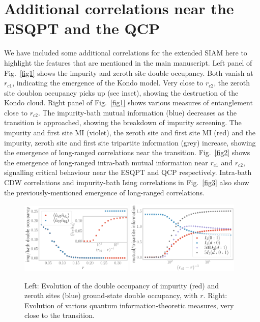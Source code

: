 \documentclass{iopart}
\begin{document}
\section{Additional correlations near the ESQPT and the QCP}
We have included some additional correlations for the extended SIAM here to highlight the features that are mentioned in the main manuscript. Left panel of Fig.~\eqref{fig1} shows the impurity and zeroth site double occupancy. Both vanish at \(r_{c1}\), indicating the emergence of the Kondo model. Very close to \(r_{c2}\), the zeroth site doublon occupancy picks up (see inset), showing the destruction of the Kondo cloud. Right panel of Fig.~\eqref{fig1} shows various measures of entanglement close to \(r_{c2}\). The impurity-bath mutual information (blue) decreases as the transition is approached, showing the breakdown of impurity screening. The impurity and first site MI (violet), the zeroth site and first site MI (red) and the impurity, zeroth site and first site tripartite information (grey) increase, showing the emergence of long-ranged correlations near the transition. Fig.~\eqref{fig2} shows the emergence of long-ranged intra-bath mutual information near \(r_{c1}\) and \(r_{c2}\), signalling critical behaviour near the ESQPT and QCP respectively. Intra-bath CDW correlations and impurity-bath Ising correlations in Fig.~\eqref{fig3} also show the previously-mentioned emergence of long-ranged correlations. 

\begin{figure}[htpb]
	\centering
	\includegraphics[width=0.48\textwidth]{doub_occ.pdf}
	\includegraphics[width=0.48\textwidth]{rc2-mut-trip-info.pdf}
	\caption{Left: Evolution of the double occupancy of impurity (red) and zeroth sites (blue) ground-state double occupancy, with \(r\). Right: Evolution of various quantum information-theoretic measures, very close to the transition. }
	\label{fig1}
\end{figure}
\end{document}
